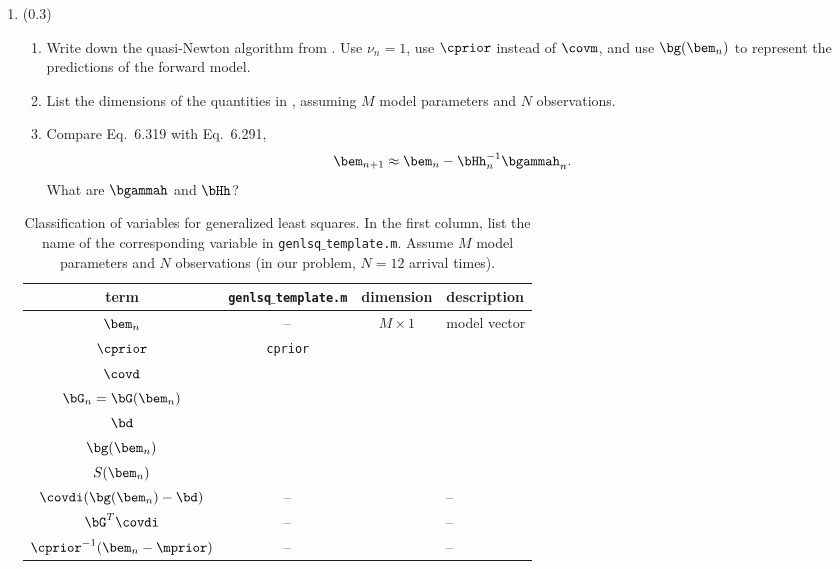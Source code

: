 \documentclass[11pt,titlepage,fleqn]{article}
\begin{document}
\begin{enumerate}
\item (0.3) 

\begin{enumerate}
\item Write down the quasi-Newton algorithm from \citet[][Eq.~6.319]{Tarantola2005}. Use $\nu_n = 1$, use $\cprior$ instead of $\covm$, and use $\bg(\bem_n)$ to represent the predictions of the forward model.

\item List the dimensions of the quantities in , assuming $M$ model parameters and $N$ observations.

\item Compare Eq.~6.319 with Eq.~6.291,
%
\begin{equation}
\bem_{n+1} \approx \bem_{n} - \bHh^{-1}_n \bgammah_n.
\end{equation}
%
What are $\bgammah$ and $\bHh$?

\end{enumerate}

\begin{table}
\centering
\caption[]{{
Classification of variables for generalized least squares. In the first column, list the name of the corresponding variable in {\tt genlsq$\_$template.m}. Assume $M$ model parameters and $N$ observations (in our problem, $N=12$ arrival times).
\label{tab:vars}
}}
\begin{tabular}{c|c|c|l}
\hline
term & {\tt genlsq$\_$template.m} & dimension & description \hspace{2cm} \\
\hline\hline 
$\bem_n$ & -- & $M \times 1$ & model vector \\ \hline
$\cprior$ & \verb+cprior+ & & \\ \hline
$\covd$ & & & \\ \hline
$\bG_n = \bG(\bem_n)$ & & & \\ \hline
$\bd$ & & & \\ \hline
$\bg(\bem_n)$ & & & \\ \hline\hline
$S(\bem_n)$ & & & \\ \hline
$\covdi (\bg(\bem_n) - \bd)$ & -- & & -- \\ \hline
$\bG^T\covdi$ & -- & & -- \\ \hline
$\cprior^{-1} (\bem_n - \mprior)$ & -- & & -- \\ \hline
\end{tabular}
\end{table}




\end{enumerate}
\end{document}
